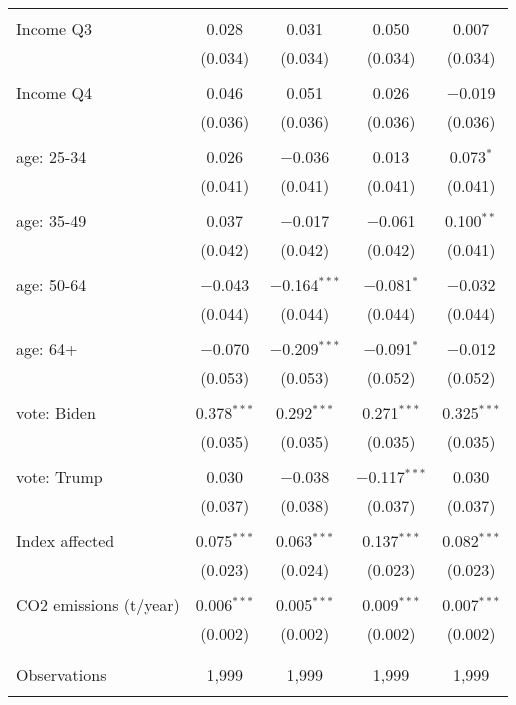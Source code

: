 \begin{tabular}{@{\extracolsep{5pt}}lcccc}
  & & & & \\ 
 Income Q3 & 0.028 & 0.031 & 0.050 & 0.007 \\ 
  & (0.034) & (0.034) & (0.034) & (0.034) \\ 
  & & & & \\ 
 Income Q4 & 0.046 & 0.051 & 0.026 & $-$0.019 \\ 
  & (0.036) & (0.036) & (0.036) & (0.036) \\ 
  & & & & \\ 
 age: 25-34 & 0.026 & $-$0.036 & 0.013 & 0.073$^{*}$ \\ 
  & (0.041) & (0.041) & (0.041) & (0.041) \\ 
  & & & & \\ 
 age: 35-49 & 0.037 & $-$0.017 & $-$0.061 & 0.100$^{**}$ \\ 
  & (0.042) & (0.042) & (0.042) & (0.041) \\ 
  & & & & \\ 
 age: 50-64 & $-$0.043 & $-$0.164$^{***}$ & $-$0.081$^{*}$ & $-$0.032 \\ 
  & (0.044) & (0.044) & (0.044) & (0.044) \\ 
  & & & & \\ 
 age: 64+ & $-$0.070 & $-$0.209$^{***}$ & $-$0.091$^{*}$ & $-$0.012 \\ 
  & (0.053) & (0.053) & (0.052) & (0.052) \\ 
  & & & & \\ 
 vote: Biden & 0.378$^{***}$ & 0.292$^{***}$ & 0.271$^{***}$ & 0.325$^{***}$ \\ 
  & (0.035) & (0.035) & (0.035) & (0.035) \\ 
  & & & & \\ 
 vote: Trump & 0.030 & $-$0.038 & $-$0.117$^{***}$ & 0.030 \\ 
  & (0.037) & (0.038) & (0.037) & (0.037) \\ 
  & & & & \\ 
 Index affected & 0.075$^{***}$ & 0.063$^{***}$ & 0.137$^{***}$ & 0.082$^{***}$ \\ 
  & (0.023) & (0.024) & (0.023) & (0.023) \\ 
  & & & & \\ 
 CO2 emissions (t/year) & 0.006$^{***}$ & 0.005$^{***}$ & 0.009$^{***}$ & 0.007$^{***}$ \\ 
  & (0.002) & (0.002) & (0.002) & (0.002) \\ 
  & & & & \\ 
\hline \\[-1.8ex] 

Observations & 1,999 & 1,999 & 1,999 & 1,999 \\ 
\hline 
\hline \\[-1.8ex] 
\end{tabular} 